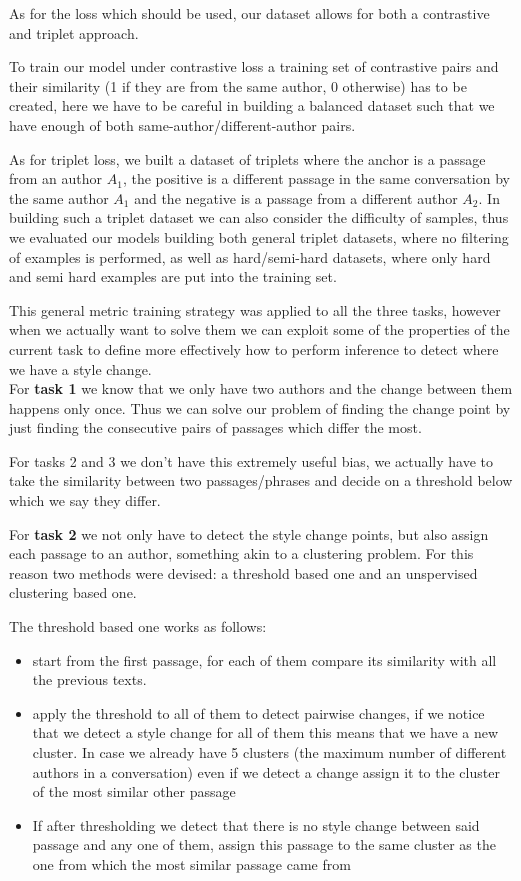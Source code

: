 \documentclass[11pt]{article}
\begin{document}
As for the loss which should be used, our dataset allows for both a contrastive and triplet approach.

To train our model under contrastive loss a training set of contrastive pairs and their similarity (1 if they are from the same author, 0 otherwise) 
has to be created, here we have to be careful in building a balanced dataset such that we have enough of both same-author/different-author pairs.

As for triplet loss, we built a dataset of triplets where the anchor is a passage from an author $A_1$, the positive is a different passage in the same conversation 
by the same author $A_1$ and the negative is a passage from a different author $A_2$.
In building such a triplet dataset we can also consider the difficulty of samples, thus we evaluated our models building both general triplet datasets, 
where no filtering of examples is performed, as well as hard/semi-hard datasets, where only hard and semi hard examples are put into the training set.

This general metric training strategy was applied to all the three tasks, however when we actually want to solve them we can exploit some of the properties of the current task to define more effectively how to perform inference to detect where we have a style change.\\

For \textbf{task 1} we know that we only have two authors and the change between them happens only once. Thus we can solve our problem of finding the change point
by just finding the consecutive pairs of passages which differ the most.

For tasks 2 and 3 we don't have this extremely useful bias, we actually have to take the similarity between two passages/phrases and decide on a threshold below which we say they differ. 

For \textbf{task 2} we not only have to detect the style change points, but also assign each passage to an author, something akin to a clustering problem.
For this reason two methods were devised: a threshold based one and an unspervised clustering based one.

The threshold based one works as follows:
\begin{itemize}
    \item start from the first passage, for each of them compare its similarity with all the previous texts.
    \item apply the threshold to all of them to detect pairwise changes, if we notice that we detect a style change for all of them this means that we have a new cluster. In case we already have 5 clusters (the maximum 
number of different authors in a conversation) even if we detect a change assign it to the cluster of the most similar other passage
\item If after thresholding we detect that there is no style change between said passage and any one of them, assign this passage to the same cluster as the one from 
which the most similar passage came from
\end{itemize}
\end{document}
